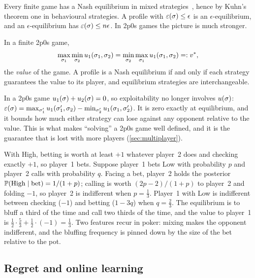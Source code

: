 Every finite game has a Nash equilibrium in mixed strategies~\cite{nash1951}, hence by Kuhn's theorem one in
behavioural strategies. A profile with $\varepsilon(\sigma) \le \epsilon$ is an $\epsilon$-equilibrium, and an
$\epsilon$-equilibrium has $\varepsilon(\sigma) \le n\epsilon$. In 2p0s games the picture is much stronger.

\begin{theorem}\label{thm:minimax}
In a finite 2p0s game,
\[
  \max_{\sigma_1}\min_{\sigma_2} u_1(\sigma_1,\sigma_2) = \min_{\sigma_2}\max_{\sigma_1} u_1(\sigma_1,\sigma_2) =: v^*,
\]
the \emph{value} of the game. A profile is a Nash equilibrium if and only if each
strategy guarantees the value to its player, and equilibrium strategies are interchangeable.
\end{theorem}

In a 2p0s game $u_1(\sigma) + u_2(\sigma) = 0$, so exploitability no longer involves $u(\sigma)$:
$\varepsilon(\sigma) = \max_{\sigma_1'} u_1(\sigma_1',\sigma_2) - \min_{\sigma_2'} u_1(\sigma_1,\sigma_2')$. It is zero
exactly at equilibrium, and it bounds how much either strategy can lose against any opponent relative to the value.
This is what makes ``solving'' a 2p0s game well defined, and it is the guarantee that is lost with more players
(\cref{sec:multiplayer}).

\begin{example}\label{ex:bluff-eq}
With High, betting is worth at least $+1$ whatever player~2 does and checking exactly $+1$, so player~1 bets.
Suppose player~1 bets Low with probability $p$ and player~2 calls with probability $q$. Facing a bet, player~2
holds the posterior $\mathbb{P}(\text{High} \mid \text{bet}) = 1/(1+p)$; calling is worth $(2p - 2)/(1+p)$ to player~2
and folding $-1$, so player~2 is indifferent when $p = \tfrac13$. Player~1 with Low is indifferent between checking
($-1$) and betting ($1 - 3q$) when $q = \tfrac23$. The equilibrium is to bluff a third of the time and call two thirds
of the time, and the value to player~1 is $\tfrac12\cdot\tfrac53 + \tfrac12\cdot(-1) = \tfrac13$. Two features recur
in poker: mixing makes the opponent indifferent, and the bluffing frequency is pinned down by the size of the bet
relative to the pot.
\end{example}

\subsection{Regret and online learning}\label{sec:regret}

